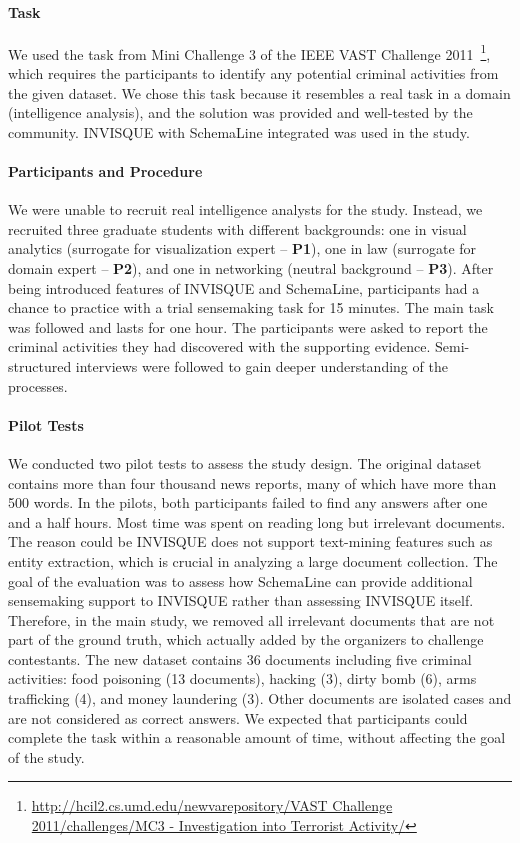 \paragraph{Task}
We used the task from Mini Challenge 3 of the IEEE VAST Challenge 2011~\footnote{\url{http://hcil2.cs.umd.edu/newvarepository/VAST Challenge 2011/challenges/MC3 - Investigation into Terrorist Activity/}}, which requires the participants to identify any potential criminal activities from the given dataset. We chose this task because it resembles a real task in a domain (intelligence analysis), and the solution was provided and well-tested by the community. INVISQUE with SchemaLine integrated was used in the study. 

\paragraph{Participants and Procedure}
We were unable to recruit real intelligence analysts for the study. Instead, we recruited three graduate students with different backgrounds:  one in visual analytics (surrogate for visualization expert -- \textbf{P1}), one in law (surrogate for domain expert -- \textbf{P2}), and one in networking (neutral background -- \textbf{P3}). After being introduced features of INVISQUE and SchemaLine, participants had a chance to practice with a trial sensemaking task for 15 minutes. The main task was followed and lasts for one hour. The participants were asked to report the criminal activities they had discovered with the supporting evidence. Semi-structured interviews were followed to gain deeper understanding of the processes.

\paragraph{Pilot Tests}
We conducted two pilot tests to assess the study design. The original dataset contains more than four thousand news reports, many of which have more than 500 words. In the pilots, both participants failed to find any answers after one and a half hours. Most time was spent on reading long but irrelevant documents. The reason could be INVISQUE does not support text-mining features such as entity extraction, which is crucial in analyzing a large document collection. The goal of the evaluation was to assess how SchemaLine can provide additional sensemaking support to INVISQUE rather than assessing INVISQUE itself. Therefore, in the main study, we removed all irrelevant documents that are not part of the ground truth, which actually added by the organizers to challenge contestants. The new dataset contains 36 documents including five criminal activities:  food poisoning (13 documents), hacking (3), dirty bomb (6), arms trafficking (4), and money laundering (3). Other documents are isolated cases and are not considered as correct answers. We expected that  participants could complete the task within a reasonable amount of time, without affecting the goal of the study. 

